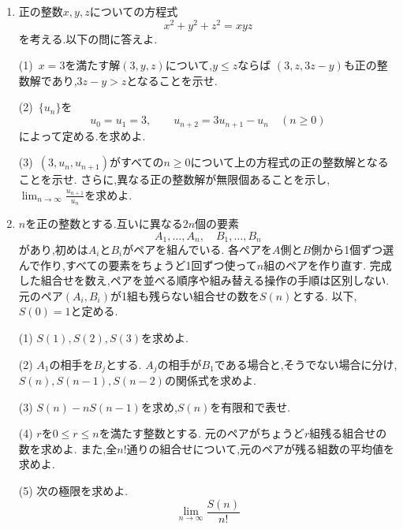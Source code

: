 \begin{enumerate}[label=\textbf{問\arabic*.},leftmargin=3.8em,format=\bookitemlink{practice-entrance}{problem}{hint}]
    \smallskip
    \noindent (1)~$a_n$が$5$の倍数となる正整数$n$をすべて求めよ.

    \smallskip
    \noindent (2)~任意の正整数$m,n$に対して,$a_m$が$a_n$を割り切ることと,
    $m$が$n$を割り切ることは同値であることを示せ.
    必要なら,補助的に$a_0=0$と定めてよい.

    \smallskip
    \noindent (3)~任意の正整数$m,n$について
    \[
      \gcd(a_m,a_n)=a_{\gcd(m,n)}
    \]
    が成り立つことを示し,$\gcd(a_{2026},a_{3040})$を求めよ.
    \par{}
  \item 正の整数$x,y,z$についての方程式
    \[
      x^2+y^2+z^2=xyz
    \]
    を考える.以下の問に答えよ.

    \smallskip
    \noindent (1)~$x=3$を満たす解$(3,y,z)$について,$y\le z$ならば
    $(3,z,3z-y)$も正の整数解であり,$3z-y>z$となることを示せ.

    \smallskip
    \noindent (2)~$\{u_n\}$を
    \[
      u_0=u_1=3,\qquad
      u_{n+2}=3u_{n+1}-u_n\quad(n\ge0)
    \]
    によって定める.を求めよ.

    \smallskip
    \noindent (3)~$(3,u_n,u_{n+1})$がすべての$n\ge0$について上の方程式の正の整数解となることを示せ.
    さらに,異なる正の整数解が無限個あることを示し,
    $\lim_{n\to\infty}\frac{u_{n+1}}{u_n}$を求めよ.
    \par{}
  \item $n$を正の整数とする.互いに異なる$2n$個の要素
    \[
      A_1,\ldots,A_n,\quad B_1,\ldots,B_n
    \]
    があり,初めは$A_i$と$B_i$がペアを組んでいる.
    各ペアを$A$側と$B$側から1個ずつ選んで作り,すべての要素をちょうど1回ずつ使って$n$組のペアを作り直す.
    完成した組合せを数え,ペアを並べる順序や組み替える操作の手順は区別しない.
    元のペア$(A_i,B_i)$が1組も残らない組合せの数を$S(n)$とする.
    以下,$S(0)=1$と定める.
    \par\smallskip
    (1) $S(1),S(2),S(3)$を求めよ.
    \par\smallskip
    (2) $A_1$の相手を$B_j$とする.
    $A_j$の相手が$B_1$である場合と,そうでない場合に分け,
    $S(n),S(n-1),S(n-2)$の関係式を求めよ.
    \par\smallskip
    (3) $S(n)-nS(n-1)$を求め,$S(n)$を有限和で表せ.
    \par\smallskip
    (4) $r$を$0\le r\le n$を満たす整数とする.
    元のペアがちょうど$r$組残る組合せの数を求めよ.
    また,全$n!$通りの組合せについて,元のペアが残る組数の平均値を求めよ.
    \par\smallskip
    (5) 次の極限を求めよ.
    \[
      \lim_{n\to\infty}\frac{S(n)}{n!}
    \]
    \par{}
\end{enumerate}

